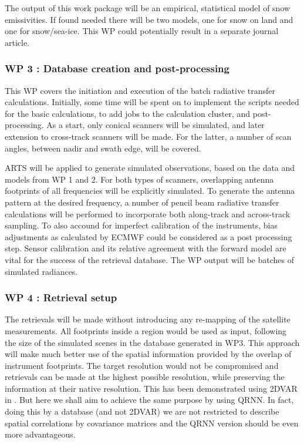 \documentclass[12pt,oneside,a4paper]{article}
\begin{document}
The output of this work package will be an empirical, statistical model of
snow emissivities. If found needed there will be two models, one for snow on
land and one for snow/sea-ice. This WP could potentially result in a separate
journal article.
\vspace{-1.0ex}

\subsubsection*{WP 3 : Database creation and post-processing}
%
\label{sec:database}	
This WP covers the initiation and execution of the batch radiative
transfer calculations. Initially, some time will be spent on to implement the
scripts needed for the basic calculations, to add jobs to the calculation
cluster, and post-processing. As a start, only conical scanners will be
simulated, and later extension to cross-track scanners will be made. For the
latter, a number of scan angles, between nadir and swath edge, will be covered.

ARTS will be applied to generate simulated observations, based on the data and
models from WP 1 and 2. For both types of scanners, overlapping antenna
footprints of all frequencies will be explicitly simulated. To generate the
antenna pattern at the desired frequency, a number of pencil beam radiative
transfer calculations will be performed to incorporate both along-track and
across-track sampling. To also accound for imperfect calibration of the
instruments, bias adjustments as calculated by ECMWF could be considered as a
post processing step. Sensor calibration and its relative agreement with the
forward model are vital for the success of the retrieval database. The WP
output will be batches of simulated radiances. \vspace{-1.0ex}


\subsubsection*{WP 4 : Retrieval setup}
%
\label{sec:setup}
The retrievals will be made without introducing any re-mapping of the satellite
measurements. All footprints inside a region would be used as input, following
the size of the simulated scenes in the database generated in WP3. This
approach will make much better use of the spatial information provided by the
overlap of instrument footprints. The target resolution would not be
compromised and retrievals can be made at the highest possible resolution,
while preserving the information at their native resolution. This has been
demonstrated using 2DVAR in \citet{duncan:anexp:19}. But here we shall aim to
achieve the same purpose by using QRNN. In fact, doing this by a database
(and not 2DVAR) we are not restricted to describe spatial correlations by
covariance matrices and the QRNN version should be even more advantageous.
\end{document}
